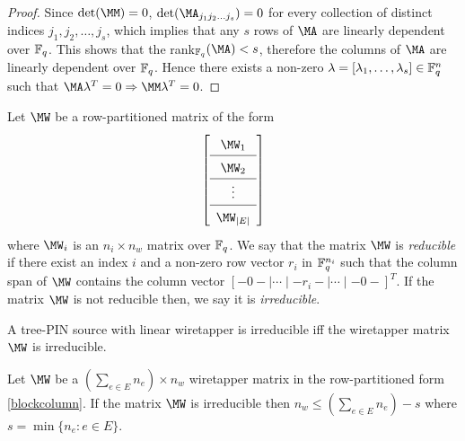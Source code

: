 \begin{proof}
Since $\det(\MM)=0$, $\det(\MA_{j_1j_2\ldots j_s})= 0$ for every collection of distinct indices $j_1,j_2,\dots,j_s$, which implies that  any $s$ rows of $\MA$ are linearly dependent over $\mathbb{F}_q$. This shows that the rank$_{ \Fq}(\MA) < s$, therefore the columns of $\MA$ are linearly dependent over $\mathbb{F}_q$. Hence there exists a  non-zero $\lambda = [\lambda_1, \ldots, \lambda_s]  \in \mathbb{F}_q^n$ such that $ \MA\lambda^T= 0 \Rightarrow \MM\lambda ^T= 0$.
\end{proof}

\begin{definition}
 Let $\MW$ be a row-partitioned matrix of the form  
 \begin{align} \label{blockcolumn}
 \renewcommand{\arraystretch}{1.5}
 \begin{bmatrix}
 \begin{array}{c}
  \MW_1\\ \hline
  \MW_2\\ \hline
  \vdots\\ \hline
  \MW_{|E|}
  \end{array}
  \end{bmatrix}
 \end{align}
where $\MW_i$ is an $n_i \times n_w$ matrix over $\mathbb{F}_q$. We say that the matrix $\MW$ is \emph{reducible} if there exist an index $i$ and a non-zero row vector $r_i$ in $\mathbb{F}_q^{n_i}$ such that the column span of $\MW$ contains the column vector $[-0- \mid  \cdots \mid - r_i-\mid \cdots \mid -0-]^T$. If the matrix $\MW$ is not reducible then, we say it is \emph{irreducible}.
\end{definition}
A tree-PIN source with linear wiretapper is irreducible iff  the wiretapper matrix $\MW$ is irreducible.
\begin{lemma} \label{lem:upbdirred}
 Let $\MW$ be a $(\sum_{e \in E} n_e) \times  n_w$ wiretapper  matrix  in the row-partitioned form \eqref{blockcolumn}. If the matrix $\MW$ is irreducible then $n_w  \leq (\sum_{e \in E}n_e)-s$ where $s=\min\{n_e: e \in E\}$. 
\end{lemma}
